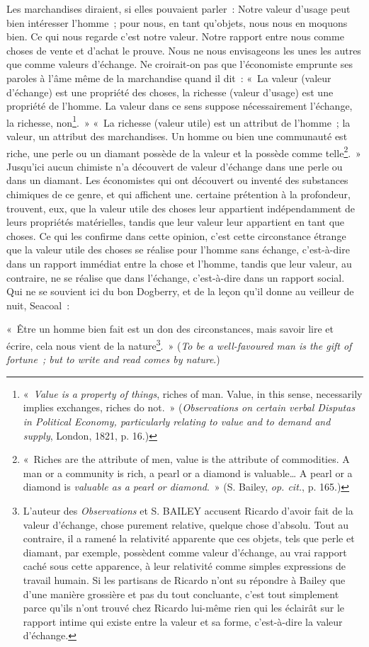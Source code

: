 \documentclass[french,twoside]{book} %
\begin{document}
Les marchandises diraient, si elles pouvaient parler : Notre valeur d’usage peut bien intéresser l’homme ; pour nous, en tant qu’objets, nous nous en moquons bien. Ce qui nous regarde c’est notre valeur. Notre rapport entre nous comme choses de vente et d’achat le prouve. Nous ne nous envisageons les unes les autres que comme valeurs d’échange. Ne croirait-on pas que l’économiste emprunte ses paroles à l’âme même de la marchandise quand il dit : « La valeur (valeur d’échange) est une propriété des choses, la richesse (valeur d’usage) est une propriété de l’homme. La valeur dans ce sens suppose nécessairement l’échange, la richesse, non\footnote{« \emph{Value is a property of things}, riches of man. Value, in this sense, necessarily implies exchanges, riches do not. » (\emph{Observations on certain verbal Disputas in Political Economy, particularly relating to value and to demand and supply}, London, 1821, p. 16.)}. » « La richesse (valeur utile) est un attribut de l’homme ; la valeur, un attribut des marchandises. Un homme ou bien une communauté est riche, une perle ou un diamant possède de la valeur et la possède comme telle\footnote{« Riches are the attribute of men, value is the attribute of commodities. A man or a community is rich, a pearl or a diamond is valuable… A pearl or a diamond is \emph{valuable as a pearl or diamond}. » (S. Bailey, \emph{op. cit.}, p. 165.)}. » Jusqu’ici aucun chimiste n’a découvert de valeur d’échange dans une perle ou dans un diamant. Les économistes qui ont découvert ou inventé des substances chimiques de ce genre, et qui affichent une. certaine prétention à la profondeur, trouvent, eux, que la valeur utile des choses leur appartient indépendamment de leurs propriétés matérielles, tandis que leur valeur leur appartient en tant que choses. Ce qui les confirme dans cette opinion, c’est cette circonstance étrange que la valeur utile des choses se réalise pour l’homme sans échange, c’est-à-dire dans un rapport immédiat entre la chose et l’homme, tandis que leur valeur, au contraire, ne se réalise que dans l’échange, c’est-à-dire dans un rapport social. Qui ne se souvient ici du bon Dogberry, et de la leçon qu’il donne au veilleur de nuit, Seacoal :\par
« Être un homme bien fait est un don des circonstances, mais savoir lire et écrire, cela nous vient de la nature\footnote{L’auteur des \emph{Observations} et S. BAILEY accusent Ricardo d’avoir fait de la valeur d’échange, chose purement relative, quelque chose d’absolu. Tout au contraire, il a ramené la relativité apparente que ces objets, tels que perle et diamant, par exemple, possèdent comme valeur d’échange, au vrai rapport caché sous cette apparence, à leur relativité comme simples expressions de travail humain. Si les partisans de Ricardo n’ont su répondre à Bailey que d’une manière grossière et pas du tout concluante, c’est tout simplement parce qu’ils n’ont trouvé chez Ricardo lui-même rien qui les éclairât sur le rapport intime qui existe entre la valeur et sa forme, c’est-à-dire la valeur d’échange.}. » (\emph{To be a well-favoured man is the gift of fortune ; but to write and read comes by nature}.)
\end{document}
